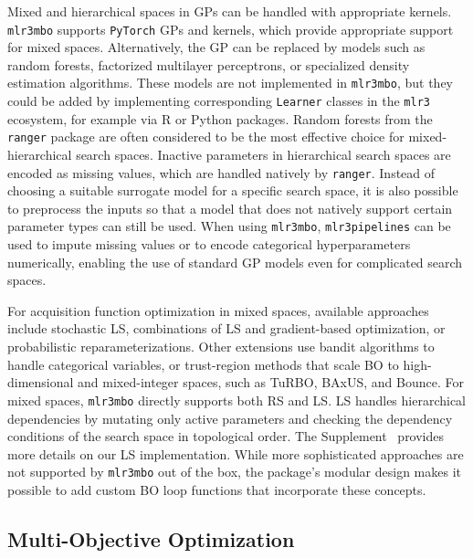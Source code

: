 \documentclass[12pt,letterpaper]{article}
\begin{document}
Mixed and hierarchical spaces in GPs can be handled with appropriate kernels\cite{hutter2009,oh2019,kim2022,bergstra2011,levesque2017,horn2019}. 
\texttt{mlr3mbo} supports \texttt{PyTorch}\cite{ansel2024} GPs and kernels, which provide appropriate support for mixed spaces.
Alternatively, the GP can be replaced by models such as random forests\cite{hutter2009,hutter2011}, factorized multilayer perceptrons\cite{schilling2015}, or specialized density estimation algorithms\cite{bergstra2011}. 
These models are not implemented in \texttt{mlr3mbo}, but they could be added by implementing corresponding \texttt{Learner} classes in the \texttt{mlr3} ecosystem, for example via R or Python packages.
Random forests from the \texttt{ranger} package\cite{wright2017} are often considered to be the most effective choice for mixed-hierarchical search spaces\cite{hutter2011}.
Inactive parameters in hierarchical search spaces are encoded as missing values, which are handled natively by \texttt{ranger}.
Instead of choosing a suitable surrogate model for a specific search space, it is also possible to preprocess the inputs so that a model that does not natively support certain parameter types can still be used.
When using \texttt{mlr3mbo}, \texttt{mlr3pipelines}\cite{binder2021} can be used to impute missing values or to encode categorical hyperparameters numerically, enabling the use of standard GP models even for complicated search spaces.

For acquisition function optimization in mixed spaces, available approaches include stochastic LS\cite{hutter2011}, combinations of LS and gradient-based optimization\cite{garrido-merchan2020}, or probabilistic reparameterizations\cite{daulton2022}.
Other extensions use bandit algorithms\cite{ru2020} to handle categorical variables, or trust-region methods that scale BO to high-dimensional and mixed-integer spaces, such as TuRBO\cite{eriksson2019}, BAxUS\cite{papenmeier2022}, and Bounce\cite{papenmeier2023}.
For mixed spaces, \texttt{mlr3mbo} directly supports both RS and LS.
LS handles hierarchical dependencies by mutating only active parameters and checking the dependency conditions of the search space in topological order.
The Supplement~ provides more details on our LS implementation.
While more sophisticated approaches are not supported by \texttt{mlr3mbo} out of the box, the package's modular design makes it possible to add custom BO loop functions that incorporate these concepts.

\subsection*{Multi-Objective Optimization}
\end{document}
